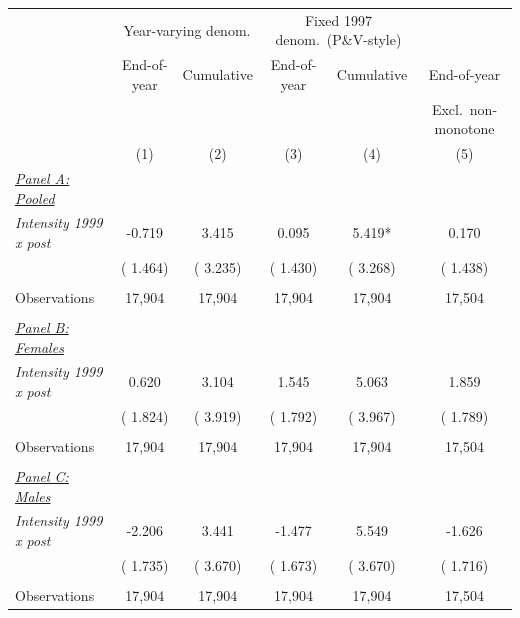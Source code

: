 \begin{tabular}{lccccc} \hline \hline
& \multicolumn{2}{c}{Year-varying denom.} & \multicolumn{2}{c}{Fixed 1997 denom.\ (P\&V-style)} & \\ 
& \multicolumn{1}{c}{End-of-year} & \multicolumn{1}{c}{Cumulative} & \multicolumn{1}{c}{End-of-year} & \multicolumn{1}{c}{Cumulative} & \multicolumn{1}{c}{End-of-year} \\ 
& & & & & \multicolumn{1}{c}{Excl.\ non-monotone} \\ 
& \multicolumn{1}{c}{(1)} & \multicolumn{1}{c}{(2)} & \multicolumn{1}{c}{(3)} & \multicolumn{1}{c}{(4)} & \multicolumn{1}{c}{(5)} \\ \toprule
\underline{\textit{Panel A: Pooled}} \\ 
\textit{Intensity 1999 x post} &       -0.719 &        3.415 &        0.095 &        5.419* &        0.170 \\ 
 & (       1.464) & (       3.235) & (       1.430) & (       3.268) & (       1.438) \\ 
  & & & & & \\ 
Observations &       17,904 &       17,904 &       17,904 &       17,904 &       17,504 \\ 
  & & & & & \\ 
\underline{\textit{Panel B: Females}} \\ 
\textit{Intensity 1999 x post} &        0.620 &        3.104 &        1.545 &        5.063 &        1.859 \\ 
 & (       1.824) & (       3.919) & (       1.792) & (       3.967) & (       1.789) \\ 
  & & & & & \\ 
Observations &       17,904 &       17,904 &       17,904 &       17,904 &       17,504 \\ 
  & & & & & \\ 
\underline{\textit{Panel C: Males}} \\ 
\textit{Intensity 1999 x post} &       -2.206 &        3.441 &       -1.477 &        5.549 &       -1.626 \\ 
 & (       1.735) & (       3.670) & (       1.673) & (       3.670) & (       1.716) \\ 
  & & & & & \\ 
Observations &       17,904 &       17,904 &       17,904 &       17,904 &       17,504 \\ 
\bottomrule
\end{tabular}
